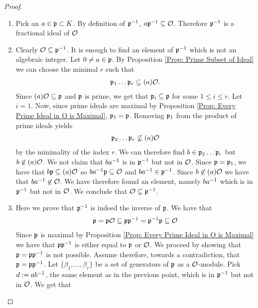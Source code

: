     \begin{proof}
    \begin{enumerate}
        \item Pick an \(a\in\mathfrak{p}\subset K\). By definition of \(\mathfrak{p}^{-1}\), \(a\mathfrak{p}^{-1}\subseteq\mathcal{O}\). Therefore \(\mathfrak{p}^{-1}\) is a fractional ideal of \(\mathcal{O}\)
        
        \item Clearly \(\mathcal{O}\subseteq\mathfrak{p}^{-1}\). It is enough to find an element of \(\mathfrak{p}^{-1}\) which is not an algebraic integer. Let \(0\neq a\in\mathfrak{p}\). By Proposition \ref{Prop: Prime Subset of Ideal} we can choose the minimal \(r\) such that 
        \begin{align*}
            \mathfrak{p}_1 \dots \mathfrak{p}_r\subseteq (a)\mathcal{O}.
        \end{align*}
        Since \((a)\mathcal{O} \subseteq \mathfrak{p}\) and \(\mathfrak{p}\) is prime, we get that \(\mathfrak{p}_i\subseteq\mathfrak{p}\) for some \(1\leq i\leq r\). Let \(i = 1\). Now, since prime ideals are maximal by Proposition \ref{Prop: Every Prime Ideal in O is Maximal}, \(\mathfrak{p}_1 = \mathfrak{p}\). Removing \(\mathfrak{p}_1\) from the product of prime ideals yields
        \begin{align*}
            \mathfrak{p}_2\dots\mathfrak{p}_r \not\subseteq (a)\mathcal{O}
        \end{align*}
        by the minimality of the index \(r\). We can therefore find \(b\in\mathfrak{p}_2 \dots \mathfrak{p}_r\) but \(b\not\in (a)\mathcal{O}\). We not claim that \(ba^{-1}\) is in \(\mathfrak{p}^{-1}\) but not in \(\mathcal{O}\). Since \(\mathfrak{p} = \mathfrak{p}_1\), we have that \(b\mathfrak{p}\subseteq (a)\mathcal{O}\) so \(ba^{-1}\mathfrak{p} \subseteq \mathcal{O}\) and \(ba^{-1}\in\mathfrak{p}^{-1}\). Since \(b\not\in (a)\mathcal{O}\) we have that \(ba^{-1}\not\in\mathcal{O}\). We have therefore found an element, namely \(ba^{-1}\) which is in \(\mathfrak{p}^{-1}\) but not in \(\mathcal{O}\). We conclude that \(\mathcal{O}\subsetneq\mathfrak{p}^{-1}\).
        \item Here we prove that \(\mathfrak{p}^{-1}\) is indeed the inverse of \(\mathfrak{p}\). We have that 
        \begin{align*}
            \mathfrak{p} = \mathfrak{p}\mathcal{O} \subseteq \mathfrak{p}\mathfrak{p}^{-1} = \mathfrak{p}^{-1}\mathfrak{p} \subseteq \mathcal{O}
        \end{align*}
         Since \(\mathfrak{p}\) is maximal by Proposition \ref{Prop: Every Prime Ideal in O is Maximal} we have that \(\mathfrak{p}\mathfrak{p}^{-1}\) is either equal to \(\mathfrak{p}\) or \(\mathcal{O}\). We proceed by showing that \(\mathfrak{p} = \mathfrak{p}\mathfrak{p}^{-1}\) is not possible. Assume therefore, towards a contradiction, that \(\mathfrak{p} = \mathfrak{p}\mathfrak{p}^{-1}\). Let \(\{\beta_1, \dots , \beta_r\}\) be a set of generators of \(\mathfrak{p}\) as a \(\mathcal{O}\)-module. Pick \(d := ab^{-1}\), the same element as in the previous point, which is in \(\mathfrak{p}^{-1}\) but not in \(\mathcal{O}\). We get that 

\end{enumerate}
\end{proof}
